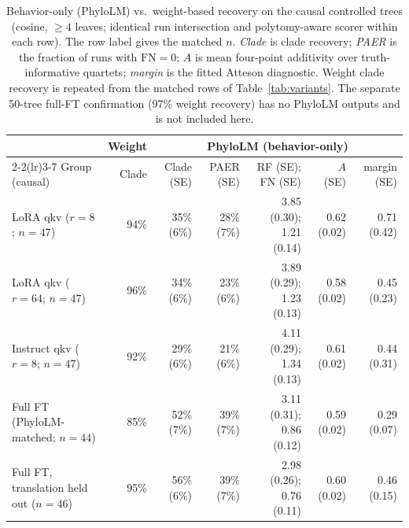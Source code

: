 \documentclass{article}
\theoremstyle{definition}
\theoremstyle{plain}
\begin{document}
\begin{table}[h]
\caption{Behavior-only (PhyloLM) vs.\ weight-based recovery on the causal controlled trees (cosine,
  $\geq 4$ leaves; identical run intersection and polytomy-aware scorer within each row). The row label
  gives the matched $n$. \emph{Clade} is clade
  recovery; \emph{PAER} is the fraction of runs with $\mathrm{FN}=0$; $A$ is mean four-point
  additivity over truth-informative quartets; \emph{margin} is the fitted Atteson diagnostic. Weight
  clade recovery is repeated from the matched rows of Table~\ref{tab:variants}. The separate 50-tree
  full-FT confirmation (97\% weight recovery) has no PhyloLM outputs and is not included here.}
\label{tab:phylolm}
\centering
\small
\setlength{\tabcolsep}{2pt}
\begin{tabular}{lrrrrrr}
\toprule
 & Weight & \multicolumn{5}{c}{PhyloLM (behavior-only)} \\
\cmidrule(lr){2-2}\cmidrule(lr){3-7}
Group (causal) & Clade & Clade (SE) & PAER (SE) & RF (SE); FN (SE) & $A$ (SE) & margin (SE) \\
\midrule
LoRA qkv ($r{=}8$; $n=47$)      & 94\% & 35\% (6\%) & 28\% (7\%) & 3.85 (0.30); 1.21 (0.14) & 0.62 (0.02) & 0.71 (0.42) \\
LoRA qkv ($r{=}64$; $n=47$)     & 96\% & 34\% (6\%) & 23\% (6\%) & 3.89 (0.29); 1.23 (0.13) & 0.58 (0.02) & 0.45 (0.23) \\
Instruct qkv ($r{=}8$; $n=47$)  & 92\% & 29\% (6\%) & 21\% (6\%) & 4.11 (0.29); 1.34 (0.13) & 0.61 (0.02) & 0.44 (0.31) \\
Full FT (PhyloLM-matched; $n=44$) & 85\% & 52\% (7\%) & 39\% (7\%) & 3.11 (0.31); 0.86 (0.12) & 0.59 (0.02) & 0.29 (0.07) \\
Full FT, translation held out ($n=46$) & 95\% & 56\% (6\%) & 39\% (7\%) & 2.98 (0.26); 0.76 (0.11) & 0.60 (0.02) & 0.46 (0.15) \\
\bottomrule
\end{tabular}
\end{table}
\end{document}

